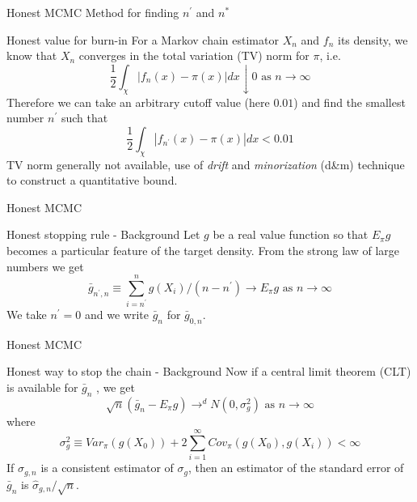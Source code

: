 \documentclass{beamer}
\begin{document}
\begin{frame}{Honest MCMC}
  Method for finding $n^\prime$ and $n^*$
  \begin{block}{Honest value for burn-in}
    For a Markov chain estimator $X_n$ and $f_n$ its density, we know that $X_n$ converges in the total variation (TV) norm for $\pi$, i.e.
    \[
      \frac{1}{2}\int_\chi|f_n(x)-\pi(x)|dx \downarrow 0 \textrm{ as } n \rightarrow \infty
    \]
    Therefore we can take an arbitrary cutoff value (here $0.01$) and find the smallest number $n^\prime$ such that
    \[
      \frac{1}{2}\int_\chi|f_{n^\prime}(x)-\pi(x)|dx < 0.01
    \]
    TV norm generally not available, use of \textit{drift} and \textit{minorization} (d\&m) technique to construct a quantitative bound.
  \end{block}
\end{frame}

\begin{frame}{Honest MCMC}
  \begin{block}{Honest stopping rule - Background}
    Let $g$ be a real value function so that $E_\pi g$ becomes a particular feature of the target density. From the strong law of large numbers we get
    \[
      \bar{g}_{n^\prime,n} \equiv \sum_{i=n^\prime}^n g(X_i)/(n-n^\prime) \rightarrow E_\pi g \textrm{ as } n \rightarrow \infty
    \]
    We take $n^\prime = 0$ and we write $\bar{g}_n$ for $\bar{g}_{0,n}$.
  \end{block}
\end{frame}

\begin{frame}{Honest MCMC}
  \begin{block}{Honest way to stop the chain - Background}
    Now if a central limit theorem (CLT) is available for $\bar{g}_n$ , we get
    \[
      \sqrt{n}(\bar{g}_n-E_\pi g) \rightarrow^d N(0,\sigma_g^2) \textrm{ as } n \rightarrow \infty
    \]
    where
    \[
      \sigma_g^2 \equiv Var_\pi(g(X_0))+2\sum_{i=1}^\infty Cov_\pi(g(X_0),g(X_i)) < \infty
    \]
    If $\widehat{\sigma}_{g,n}$ is a consistent estimator of $\sigma_g$, then an estimator of the standard error of $\bar{g}_n$ is $\widehat{\sigma}_{g,n}/\sqrt{n}$.
  \end{block}
\end{frame}
\end{document}
